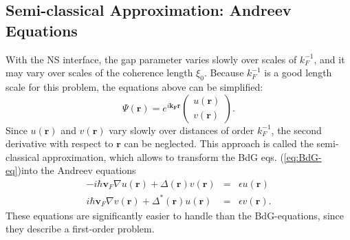 \subsection*{Semi-classical Approximation: Andreev Equations}

With the NS interface, the gap parameter varies slowly over scales of $k_F^{-1}$, and it may vary over scales of the coherence length $\xi_0$. Because $k_F^{-1}$ is a good length scale for this problem, the equations above can be simplified:
\begin{equation}
\Psi \left( \mathbf{r} \right) = e^{i \mathbf{k_F} \mathbf{r} } \begin{pmatrix} u \left( \mathbf{r} \right) \\ v \left( \mathbf{r} \right)\end{pmatrix}.
\end{equation}
Since $u  \left( \mathbf{r} \right) $ and $v  \left( \mathbf{r} \right) $ vary slowly over distances of order $k_F^{-1}$, the second derivative with respect to $\mathbf{r}$ can be neglected. This approach is called the semi-classical approximation, which allows to transform the BdG eqs. (\ref{eq:BdG-eq})into the Andreev equations
\begin{eqnarray}
- i \hbar \mathbf{v}_F \nabla u \left( \mathbf{r} \right)  + \Delta \left( \mathbf{r} \right)  v  \left( \mathbf{r} \right)  &=& \epsilon u  \left( \mathbf{r} \right)  \\
 i \hbar \mathbf{v}_F \nabla v  \left( \mathbf{r} \right)  + \Delta^* \left( \mathbf{r} \right)  u  \left( \mathbf{r} \right)  &=& \epsilon v  \left( \mathbf{r} \right) .
\end{eqnarray}
These equations are significantly easier to handle than the BdG-equations, since they describe a first-order problem.


